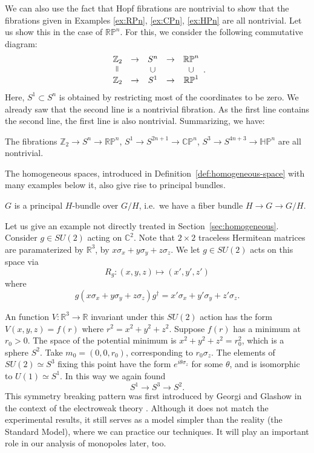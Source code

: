 \documentclass[12pt]{article}
\numberwithin{equation}{section}
\theoremstyle{remark}
\def\bC{\mathbb{C}}
\def\bR{\mathbb{R}}
\def\bZ{\mathbb{Z}}
\def\RP{\mathbb{RP}}
\def\CP{\mathbb{CP}}
\def\HP{\mathbb{HP}}
\begin{document}
We can also use the fact that Hopf fibrations are nontrivial to show that
the fibrations given in Examples \ref{ex:RPn}, \ref{ex:CPn}, \ref{ex:HPn} 
are all nontrivial.
Let us show this in the case of $\RP^n$. For this, we consider the following commutative diagram:
\begin{equation}
\begin{array}{ccccc}
  \bZ_2 &\to& S^n &\to& \RP^{n}  \\
   \rotatebox{90}{$=$} & & \cup & & \cup \\
    \bZ_2 &\to& S^1 &\to& \RP^1
\end{array}.
\end{equation}
Here, $S^1\subset S^n$ is obtained by restricting most of the coordinates to be zero.
We already saw that the second line is a nontrivial fibration.
As the first line contains the second line, the first line is also nontrivial.
Summarizing, we have: 
\begin{proposition}
  \label{prop:nontriviality-projective-fibration}
  The fibrations $\bZ_2\to S^n\to \RP^n$,
  $S^1\to S^{2n+1}\to \CP^n$,
  $S^3\to S^{4n+3}\to \HP^n$
  are all nontrivial.
\end{proposition}

The homogeneous spaces, introduced in Definition~\ref{def:homogeneous-space}
with many examples below it,
also give rise to principal bundles.
\begin{proposition}
  $G$ is a principal $H$-bundle over $G/H$, i.e.~we have a fiber bundle $H\to G\to G/H$.
\end{proposition}

Let us give an example not directly treated in Section~\ref{sec:homogeneous}.
Consider $g\in SU(2)$ acting on $\bC^2$.
Note that $2\times 2$ traceless Hermitean matrices are paramaterized by $\bR^3$,
by $x\sigma_x+y\sigma_y+z\sigma_z$.
We let $g\in SU(2)$ acts on this space via \begin{equation}
R_g: (x,y,z) \mapsto (x',y',z')  \label{eq:Rg1}
\end{equation} where \begin{equation}
g(x\sigma_x+y\sigma_y+z\sigma_z)g^\dagger = x'\sigma_x+y'\sigma_y+z'\sigma_z.
\label{eq:Rg2}
\end{equation}

An function $V:\bR^3\to \bR$ invariant under this $SU(2)$ action 
has the form $V(x,y,z)=f(r)$ where $r^2={x^2+y^2+z^2}$.
Suppose $f(r)$ has a minimum at $r_0>0$.
The space of the potential minimum is $x^2+y^2+z^2=r_0^2$, which is a sphere $S^2$.
Take $m_0=(0,0,r_0)$, corresponding to $r_0 \sigma_z$.
The elements of $SU(2)\simeq S^3$ fixing this point have the form $e^{i\theta \sigma_z}$ for some $\theta$,
and is isomorphic to $U(1)\simeq S^1$.
In this way we again found \begin{equation}
  S^1 \to S^3 \to S^2.
\end{equation}
This symmetry breaking pattern was first introduced by Georgi and Glashow in the context of the electroweak theory \cite{Georgi:1972cj}.
Although it does not match the experimental results,
it still serves as a model simpler than the reality (the Standard Model),
where we can practice our techniques. 
It will play an important role in our analysis of monopoles later, too.
\end{document}
